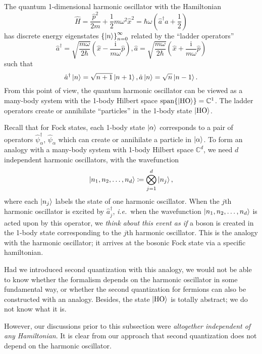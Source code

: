 \documentclass{article}
\theoremstyle{definition}
\theoremstyle{plain}
\numberwithin{equation}{section}
\begin{document}
The quantum 1-dimensional harmonic oscillator 
with the Hamiltonian 
\[
    \hat{H}
    =
    \frac{\hat{p}^{2}}{2m}
    +
    \frac{1}{2}
    m \omega ^{2} 
    \hat{x}^{2}
    =
    \hbar \omega 
    \left( \hat{a}^{\dagger} \hat{a}+\frac{1}{2} \right) 
\]
has discrete energy eigenstates 
$\left\{ \ket{n} \right\}_{n=0}^{\infty}$
related 
by the ``ladder operators'' 
\[
    \hat{a}^{\dagger}
    =
    \sqrt{\frac{m \omega}{2 \hbar}}
    \left( 
        \hat{x}
        -
        \frac{\mathrm{i}}{m \omega} 
        \hat{p}
     \right), 
    \hat{a} 
    =
    \sqrt{\frac{m \omega}{2 \hbar}}
    \left( 
        \hat{x}
        +
        \frac{\mathrm{i}}{m \omega} 
        \hat{p}
     \right)
\]
such that 
\[
    \hat{a}^{\dagger} \ket{n} = \sqrt{n+1} \ket{n+1},
    \hat{a} \ket{n} = \sqrt{n} \ket{n-1}.
\]
From this point of view, 
the quantum harmonic oscillator 
can be viewed as a many-body system 
with the 1-body Hilbert space 
$\operatorname{span}\{\ket{\text{HO}}\}
=
\mathbb{C}^{1}$. 
The ladder operators create or annihilate 
``particles'' in the 1-body state 
$\ket{\text{HO}}$. 

Recall that for Fock states, 
each 1-body state $\ket{\alpha}$ 
corresponds to 
a pair of operators 
$\hat{\psi}^{\dagger}_{\alpha}$, 
$\hat{\psi}_{\alpha}$ which 
can create or annihilate a particle in $\ket{\alpha}$. 
To form an analogy with 
a many-body system with 1-body Hilbert space 
$\mathbb{C}^{d}$, 
we need $d$ independent harmonic oscillators, 
with the wavefunction
\[
    \ket{n_1,n_2, \ldots ,n_d}
    \coloneqq
    \bigotimes _{j=1}^{d}\ket{n_{j}},
\]
where each $\ket{n_{j}}$ labels the state of one 
harmonic oscillator. 
When the $j$th harmonic oscillator 
is excited by $\hat{a}^{\dagger}_{j}$, 
\textit{i.e.}\ when the wavefunction 
$\ket{n_1,n_2, \ldots ,n_d}$ 
is acted upon 
by this operator, 
we \emph{think about this event as if} 
a boson is created in the 1-body state 
corresponding to the $j$th harmonic oscillator. 
This is the analogy with the harmonic oscillator; 
it arrives at the bosonic Fock state 
via a specific hamiltonian. 

Had we introduced second quantization 
with this analogy, we would not be able to know 
whether the formalism depends on 
the harmonic oscillator in some fundamental way, 
or whether the second quantization for fermions 
can also be constructed with an analogy. 
Besides, the state $\ket{\text{HO}}$ is 
totally abstract; we do not know what it is. 

However, our discussions prior to this subsection 
were \emph{altogether independent of any Hamiltonian}. 
It is clear from our approach that second quantization 
does not depend on the harmonic oscillator.
\end{document}
